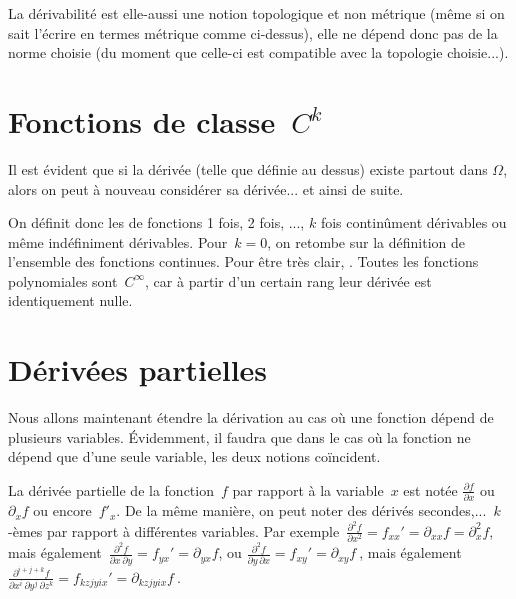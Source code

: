 \medskip
La dérivabilité est elle-aussi une notion topologique et non métrique (même si on sait
l'écrire en termes métrique comme ci-dessus), elle ne dépend donc pas
de la norme choisie (du moment que celle-ci est compatible avec la topologie choisie...).

\medskip
\section{Fonctions de classe~$C^k$}
\medskipvm
Il est évident que si la dérivée (telle que définie au dessus) existe partout dans
$\Omega$, alors on peut à nouveau considérer sa dérivée... et ainsi de suite.

On définit donc les 
de fonctions 1 fois, 2 fois, ..., $k$ fois continûment dérivables ou même indéfiniment
dérivables.
\medskipvm
Pour~$k=0$, on retombe sur la définition de l'ensemble des fonctions
continues.
\medskipvm
Pour être très clair, .
\medskipvm
Toutes les fonctions polynomiales sont~$C^\infty$, car à partir d'un certain rang
leur dérivée est identiquement nulle.

\medskip
\section{Dérivées partielles}
Nous allons maintenant étendre la dérivation au cas où une fonction dépend
de plusieurs variables.
Évidemment, il faudra que dans le cas où la fonction ne dépend que d'une seule
variable, les deux notions coïncident.

\medskip
{}
\medskipvm
La dérivée partielle de la fonction~$f$ par rapport à la variable~$x$ est notée
$\frac{ \partial f}{ \partial x}$ ou~$\partial_x f$ ou encore~$f'_x$.
\medskipvm
De la même manière, on peut noter des dérivés secondes,...~$k$-èmes par
rapport à différentes variables.
Par exemple~$\frac{ \partial^2 f}{ \partial x^2} = f_{xx}' = \partial_{xx} f = \partial^2_x f$,
mais également~$\frac{ \partial^2 f}{\partial x\,\partial y} = f_{yx}' = \partial_{yx} f$, ou
$\frac{ \partial^2 f}{\partial y\,\partial x} = f_{xy}' = \partial_{xy} f~$, mais également
$\frac{ \partial^{i+j+k} f}{ \partial x^i\, \partial y^j\, \partial z^k} = f_{kz jy ix}' = \partial_{kz jy ix} f~$.


